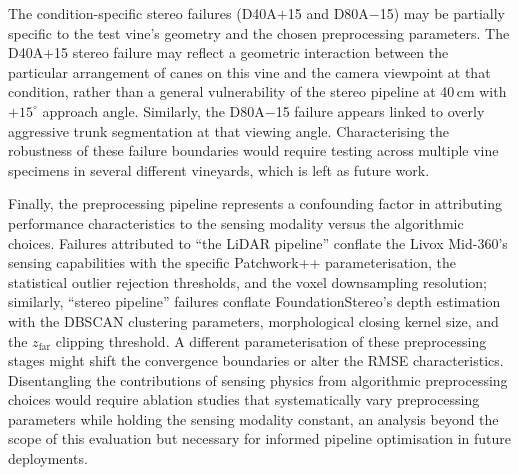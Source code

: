 The condition-specific stereo failures (D40A$+$15 and D80A$-$15) may be partially specific to the test vine's geometry and the chosen preprocessing parameters. The D40A$+$15 stereo failure may reflect a geometric interaction between the particular arrangement of canes on this vine and the camera viewpoint at that condition, rather than a general vulnerability of the stereo pipeline at 40\,cm with $+15^{\circ}$ approach angle. Similarly, the D80A$-$15 failure appears linked to overly aggressive trunk segmentation at that viewing angle. Characterising the robustness of these failure boundaries would require testing across multiple vine specimens in several different vineyards, which is left as future work.

Finally, the preprocessing pipeline represents a confounding factor in attributing performance characteristics to the sensing modality versus the algorithmic choices. Failures attributed to ``the LiDAR pipeline'' conflate the Livox Mid-360's sensing capabilities with the specific Patchwork++ parameterisation, the statistical outlier rejection thresholds, and the voxel downsampling resolution; similarly, ``stereo pipeline'' failures conflate FoundationStereo's depth estimation with the DBSCAN clustering parameters, morphological closing kernel size, and the $z_\text{far}$ clipping threshold. A different parameterisation of these preprocessing stages might shift the convergence boundaries or alter the RMSE characteristics. Disentangling the contributions of sensing physics from algorithmic preprocessing choices would require ablation studies that systematically vary preprocessing parameters while holding the sensing modality constant, an analysis beyond the scope of this evaluation but necessary for informed pipeline optimisation in future deployments.
